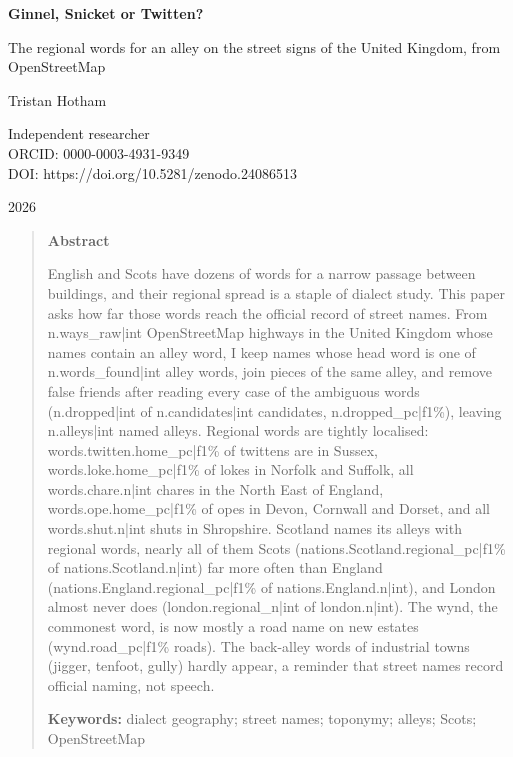 \documentclass[11pt,a4paper]{article}
\begin{document}
\begin{center}
{\Large\bfseries Ginnel, Snicket or Twitten?\par}
\vspace{0.4em}
{\large The regional words for an alley on the street signs of the United Kingdom, from OpenStreetMap\par}
\vspace{1.2em}
{\large Tristan Hotham\par}
\vspace{0.3em}
{\small Independent researcher\\
ORCID: 0000-0003-4931-9349\\
DOI: https://doi.org/10.5281/zenodo.24086513\par}
\vspace{0.8em}
2026
\end{center}

\begin{quote}
\small
\begin{center}\textbf{Abstract}\end{center}
English and Scots have dozens of words for a narrow passage between buildings, and their regional spread is a staple of dialect study. This paper asks how far those words reach the official record of street names. From {{n.ways_raw|int}} OpenStreetMap highways in the United Kingdom whose names contain an alley word, I keep names whose head word is one of {{n.words_found|int}} alley words, join pieces of the same alley, and remove false friends after reading every case of the ambiguous words ({{n.dropped|int}} of {{n.candidates|int}} candidates, {{n.dropped_pc|f1}}\%), leaving {{n.alleys|int}} named alleys. Regional words are tightly localised: {{words.twitten.home_pc|f1}}\% of twittens are in Sussex, {{words.loke.home_pc|f1}}\% of lokes in Norfolk and Suffolk, all {{words.chare.n|int}} chares in the North East of England, {{words.ope.home_pc|f1}}\% of opes in Devon, Cornwall and Dorset, and all {{words.shut.n|int}} shuts in Shropshire. Scotland names its alleys with regional words, nearly all of them Scots ({{nations.Scotland.regional_pc|f1}}\% of {{nations.Scotland.n|int}}) far more often than England ({{nations.England.regional_pc|f1}}\% of {{nations.England.n|int}}), and London almost never does ({{london.regional_n|int}} of {{london.n|int}}). The wynd, the commonest word, is now mostly a road name on new estates ({{wynd.road_pc|f1}}\% roads). The back-alley words of industrial towns (jigger, tenfoot, gully) hardly appear, a reminder that street names record official naming, not speech.

\textbf{Keywords:} dialect geography; street names; toponymy; alleys; Scots; OpenStreetMap
\end{quote}
\end{document}
